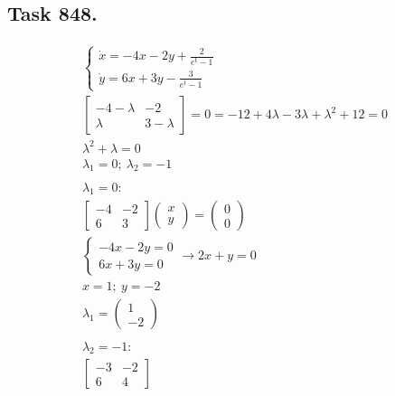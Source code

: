 \documentclass{article}
\begin{document}
\subsection*{Task 848.}

\addtolength{\jot}{1pt}
\begin{fleqn}[1\parindent]
  \begin{gather*}
    \begin{cases}
      \dot{x} = -4x-2y+\frac{2}{e^t-1} \\ 
      \dot{y} = 6x+3y-\frac{3}{e^t-1}
    \end{cases} \\ 
    \begin{bmatrix}
      -4-\lambda & -2 \\ 
      \lambda & 3-\lambda
    \end{bmatrix} = 0 = -12+4\lambda-3\lambda+\lambda^2+12=0 \\ 
    \lambda^2+\lambda = 0 \\ 
    \lambda_1 = 0;\ \lambda_2 = -1 \\ \\ 
    \lambda_1 = 0: \\ 
    \begin{bmatrix}
      -4 & -2 \\ 6 & 3
    \end{bmatrix}
    \begin{pmatrix}
      x \\ y
    \end{pmatrix}
    =
    \begin{pmatrix}
      0 \\ 0
    \end{pmatrix} \\ 
    \begin{cases}
      -4x-2y=0 \\ 
      6x+3y=0
    \end{cases} \rightarrow 
    2x+y=0 \\ 
    x = 1;\ y=-2 \\ 
    \lambda_1 = \begin{pmatrix}
      1 \\ -2
    \end{pmatrix} \\ \\
    \lambda_2 = -1: \\
    \begin{bmatrix}
      -3 & -2 \\ 6 & 4
    \end{bmatrix}

\end{gather*}
\end{fleqn}
\end{document}
